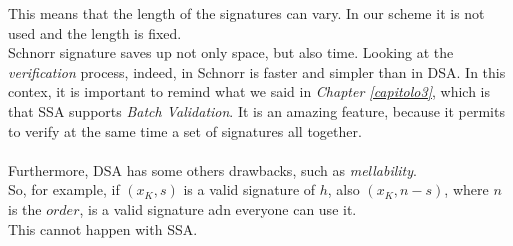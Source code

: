 This means that the length of the signatures can vary. In our scheme it is not used and the length is fixed.\\
Schnorr signature saves up not only space, but also time.
Looking at the \textit{verification} process, indeed, in Schnorr is faster and simpler than in DSA. 
In this contex, it is important to remind what we said in \textit{Chapter \eqref{capitolo3}}, which is that SSA supports \textit{Batch Validation}. It is an amazing feature, because it permits to verify at the same time a set of signatures all together.\\
\\
Furthermore, DSA has some others drawbacks, such as \textit{mellability}.\\
So, for example, if $(x_{K},s)$ is a valid signature of $h$, also $(x_{K},n-s)$, where $n$ is the $order$, is a valid signature adn everyone can use it.\\
This cannot happen with SSA.\\

